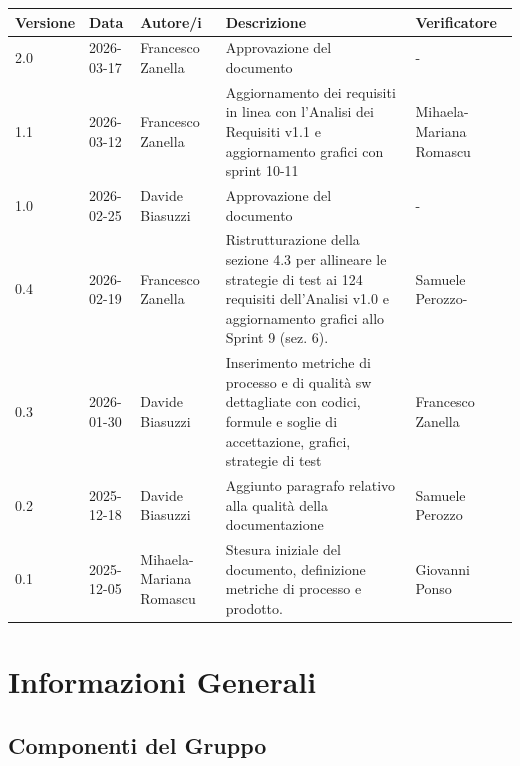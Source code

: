 \documentclass[a4paper,11pt,oneside]{scrartcl}
\begin{document}
\begin{center}
\renewcommand{\arraystretch}{1.5}
\begin{tabularx}{\textwidth}{@{}p{}p{}p{}X>{\centering\arraybackslash}p{}@{}}
\toprule
\textbf{Versione} & \textbf{Data} & \textbf{Autore/i} & \textbf{Descrizione} & \textbf{Verificatore} \\
\midrule
2.0 & 2026-03-17 & Francesco Zanella & Approvazione del documento & -\\
1.1 & 2026-03-12 & Francesco Zanella & Aggiornamento dei requisiti in linea con l'Analisi dei Requisiti v1.1 e aggiornamento grafici con sprint 10-11 & Mihaela-Mariana Romascu\\
1.0 & 2026-02-25 & Davide Biasuzzi & Approvazione del documento & -\\
0.4 & 2026-02-19 & Francesco Zanella & Ristrutturazione della sezione 4.3 per allineare le strategie di test ai 124 requisiti dell'Analisi v1.0 e aggiornamento grafici allo Sprint 9 (sez. 6). & Samuele Perozzo-\\
0.3 & 2026-01-30 & Davide Biasuzzi & Inserimento metriche di processo e di qualità sw dettagliate con codici, formule e soglie di accettazione, grafici, strategie di test & Francesco Zanella\\
0.2 & 2025-12-18 & Davide Biasuzzi & Aggiunto paragrafo relativo alla qualità della documentazione & Samuele Perozzo\\
0.1 & 2025-12-05 & Mihaela-Mariana Romascu & Stesura iniziale del documento, definizione metriche di processo e prodotto. & Giovanni Ponso\\
\bottomrule
\end{tabularx}
\end{center}

\newpage
\tableofcontents
\newpage

\section*{Informazioni Generali}

\subsection*{Componenti del Gruppo}
\end{document}
